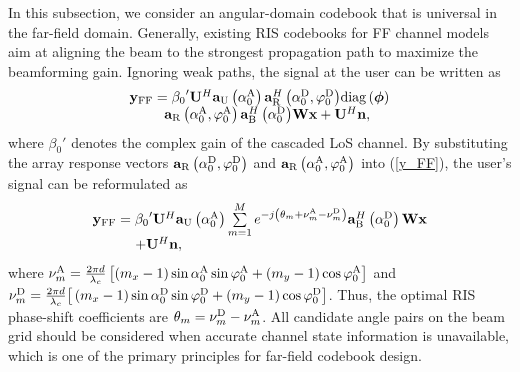 \documentclass[lettersize, journal]{IEEEtran}
\begin{document}
In this subsection, we consider an angular-domain codebook that is universal in the far-field domain. 
Generally, existing RIS codebooks for FF channel models aim at aligning the beam to the strongest propagation path to maximize the beamforming gain.
Ignoring weak paths, the signal at the user can be written as
\begin{equation}\label{y_FF}
\begin{array}{l}
{\bf{y}}_{\rm{FF}} = {\beta _0}'{\bf{U}}^H{{\bf{a}}_{\rm{U}}\left( {\alpha _0^{\rm{A}}} \right) {{\bf{a}}_{\rm{R}}^H}\left( {\alpha _0^{\rm{D}}}, {\varphi _0^{\rm{D}}} \right) } {\rm diag} \left({\bm{\phi }}\right)  \\
\;\;\;\; \;\;\;\;\; {{\bf{a}}_{\rm{R}}\left( {\alpha _0^{\rm{A}}}, {\varphi _0^{\rm{A}}} \right) {{\bf{a}}_{\rm{B}}^H}\left( {\alpha _0^{\rm{D}}} \right) } {\bf{W}} {\bf{x}} + {\bf{U}}^H {\bf{n}},
\end{array}
\end{equation}
where ${\beta _0}'$ denotes the complex gain of the cascaded LoS channel.
By substituting the array response vectors ${{\bf{a}}_{\rm{R}}}\left( {\alpha _0^{\rm{D}}}, {\varphi _0^{\rm{D}}} \right)$ and ${\bf{a}}_{\rm{R}}\left( {\alpha _0^{\rm{A}}}, {\varphi _0^{\rm{A}}} \right)$ into (\ref{y_FF}), the user's signal can be reformulated as 
\begin{equation}
\begin{array}{l}
{\bf{y}}_{\rm{FF}} = {\beta _0}'{\bf{U}}^H{\bf{a}}_{\rm{U}}\left( {\alpha _0^{\rm{A}}} \right) \sum\limits_{m = 1}^{M}  e^{ -j\left(\theta_m + \nu_{m}^{{\rm{A}}} - \nu_{m}^{{\rm{D}}} \right) }  {{\bf{a}}_{\rm{B}}^H}\left( {\alpha _0^{\rm{D}}} \right)  {\bf{W}} {\bf{x}} \\
\;\;\;\;\;\;\;\;\;\;\; + {\bf{U}}^H {\bf{n}},
\end{array}
\end{equation}
where $\nu_{m}^{{\rm{A}}} = \frac{{2\pi d }}{\lambda_c } \left[ \left( {{m_x} - 1} \right)\sin \alpha_0^{\rm{A}} \sin \varphi_0^{\rm{A}} + { \left( {{m_y} - 1} \right)\cos \varphi_0^{\rm{A}} }  \right] $ and  $\nu_{m}^{{\rm{D}}} = \frac{{2\pi d }}{\lambda_c } \big[ \left( {{m_x} - 1} \right)\sin \alpha_0^{\rm{D}} \sin \varphi_0^{\rm{D}} +  \left( {{m_y} - 1} \right)\cos \varphi_0^{\rm{D}}   \big] $.
Thus, the optimal RIS phase-shift coefficients are $\theta_m =  \nu_{m}^{{\rm{D}}} - \nu_{m}^{{\rm{A}}}$.
All candidate angle pairs on the beam grid should be considered when accurate channel state information is unavailable,  which is one of the primary principles for far-field codebook design. 
\end{document}
